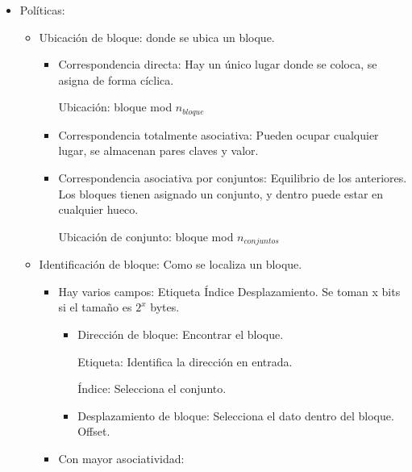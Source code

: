 \documentclass[12pt, twoside, openright]{report} %
\begin{document}
\begin{itemize}

	\item Políticas:

	      \begin{itemize}

		      \item Ubicación de bloque: donde se ubica un bloque.

		            \begin{itemize}

			            \item Correspondencia directa: Hay un único lugar donde se coloca,
			                  se asigna de forma cíclica.


			                  Ubicación: bloque mod \(n_{bloque}\)

			            \item Correspondencia totalmente asociativa: Pueden ocupar cualquier
			                  lugar, se almacenan pares claves y valor.
			            \item Correspondencia asociativa por conjuntos: Equilibrio de los
			                  anteriores. Los bloques tienen asignado un conjunto, y dentro
			                  puede estar en cualquier hueco.


			                  Ubicación de conjunto: bloque mod \(n_{conjuntos}\)

		            \end{itemize}
		      \item Identificación de bloque: Como se localiza un bloque.

		            \begin{itemize}

			            \item Hay varios campos: Etiqueta \textbar{} Índice \textbar{}
			                  Desplazamiento. Se toman x bits si el tamaño es \(2^x\) bytes.

			                  \begin{itemize}

				                  \item Dirección de bloque: Encontrar el bloque.

				                        Etiqueta: Identifica la dirección en entrada.

				                        Índice: Selecciona el conjunto.

				                  \item Desplazamiento de bloque: Selecciona el dato dentro del
				                        bloque. Offset.
			                  \end{itemize}
			            \item Con mayor asociatividad:


\end{itemize}
\end{itemize}
\end{itemize}
\end{document}
